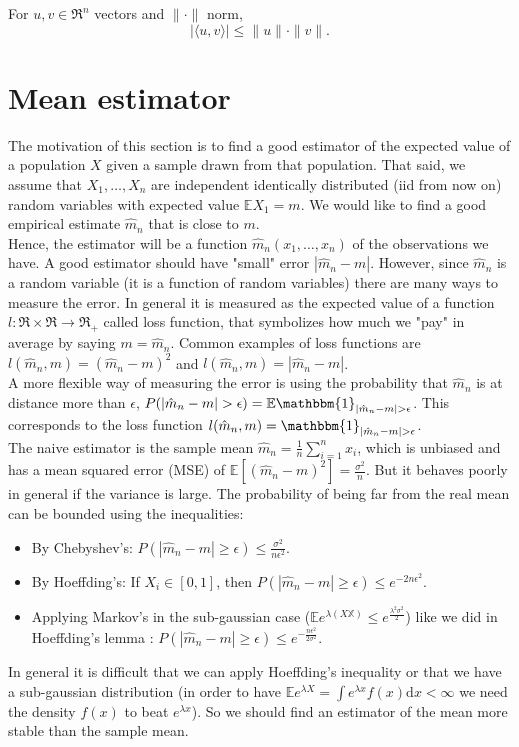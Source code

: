 \documentclass[11pt, english]{article}
\begin{document}
For $u,v\in \Re^n$ vectors and $\|\cdot\|$ norm,
\begin{equation}
	|\langle u,v\rangle|\leq\|u\|\cdot\|v\|.
\end{equation}

\section{Mean estimator}


The motivation of this section is to find a good estimator of the expected value of a population $X$ given a sample drawn from that population. That said, we assume that $X_1,\dots,X_n$ are independent identically distributed (iid from now on) random variables with expected value $\mathbb{E}X_1=m$. We would like to find a good empirical estimate $\hat{m}_n$ that is close to $m$. \\

Hence, the estimator will be a function $\hat{m}_n(x_1,\dots,x_n)$ of the observations we have. A good estimator should have "small" error $|\hat{m}_n-m|$. However, since $\hat{m}_n$ is a random variable (it is a function of random variables) there are many ways to measure the error. In general it is measured as the expected value of a function $l:\Re\times\Re\rightarrow\Re_+$ called loss function, that symbolizes how much we "pay" in average by saying $m=\hat{m}_n$. Common examples of loss functions are $l(\hat{m}_n,m)=(\hat{m}_n-m)^2$ and $l(\hat{m}_n,m)=|\hat{m}_n-m|$. \\
A more flexible way of measuring the error is using the probability that $\hat{m}_n$ is at distance more than $\epsilon$, $P(|\hat{m}_n-m|>\epsilon)=\mathbb{E}\mathbbm{1}_{|\hat{m}_n-m|>\epsilon}$. This corresponds to the loss function $l(\hat{m}_n,m)=\mathbbm{1}_{|\hat{m}_n-m|>\epsilon}$.\\

The naive estimator is the sample mean $\hat{m}_n=\frac{1}{n}\sum\limits_{i=1}^n x_i$, which is unbiased and has a mean squared error (MSE) of $\mathbb{E}[(\hat{m}_n-m)^2]=\frac{\sigma^2}{n}$. But it behaves poorly in general if the variance is large. The probability of being far from the real mean can be bounded using the inequalities:
\begin{itemize}
	\item By Chebyshev's: $P(|\hat{m}_n-m|\geq \epsilon)\leq\frac{\sigma^2}{n\epsilon^2}$.
	\item By Hoeffding's: If $X_i\in [0,1]$, then $P(|\hat{m}_n-m|\geq \epsilon)\leq e^{-2n\epsilon^2}$.
	\item Applying Markov's in the sub-gaussian case ($\mathbb{E}e^{\lambda(X\mathbb{X})}\leq e^{\frac{\lambda^2\sigma^2}{2}}$) like we did in Hoeffding's lemma : $P(|\hat{m}_n-m|\geq \epsilon)\leq e^{-\frac{n\epsilon^2}{2\sigma^2}}$. 
\end{itemize}
In general it is difficult that we can apply Hoeffding's inequality or that we have a sub-gaussian distribution (in order to have $\mathbb{E}e^{\lambda X}=\int e^{\lambda x}f(x)\text{d}x<\infty$ we need the density $f(x)$ to beat $e^{\lambda x}$). So we should find an estimator of the mean more stable than the sample mean.
\end{document}
